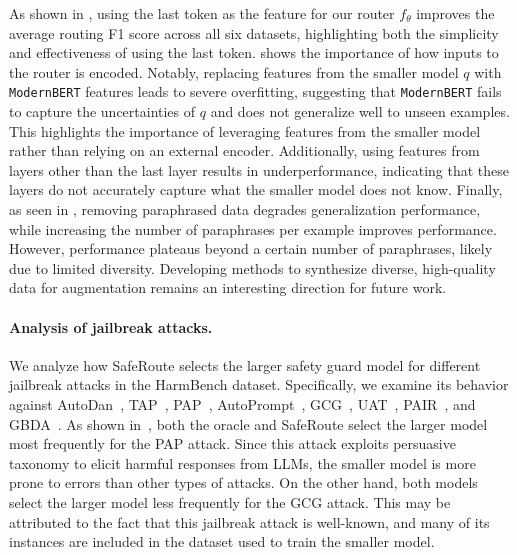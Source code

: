 As shown in , using the last token as the feature for our router $f_\theta$ improves the average routing F1 score across all six datasets, highlighting both the simplicity and effectiveness of using the last token.  
 shows the importance of how inputs to the router is encoded. Notably, replacing features from the smaller model $q$ with \texttt{ModernBERT} features leads to severe overfitting, suggesting that \texttt{ModernBERT} fails to capture the uncertainties of $q$ and does not generalize well to unseen examples. This highlights the importance of leveraging features from the smaller model rather than relying on an external encoder. Additionally, using features from layers other than the last layer results in underperformance, indicating that these layers do not accurately capture what the smaller model does not know.  
Finally, as seen in , removing paraphrased data degrades generalization performance, while increasing the number of paraphrases per example improves performance. However, performance plateaus beyond a certain number of paraphrases, likely due to limited diversity. Developing methods to synthesize diverse, high-quality data for augmentation remains an interesting direction for future work.



\paragraph{Analysis of jailbreak attacks.} We analyze how SafeRoute selects the larger safety guard model for different jailbreak attacks in the HarmBench dataset. Specifically, we examine its behavior against AutoDan~\citep{autodan}, TAP~\citep{tap}, PAP~\citep{pap}, AutoPrompt~\citep{autoprompt}, GCG~\citep{zou2023universal}, UAT~\citep{uat}, PAIR~\citep{pair}, and GBDA~\citep{gbda}. As shown in~, both the oracle and SafeRoute select the larger model most frequently for the PAP attack. Since this attack exploits persuasive taxonomy to elicit harmful responses from LLMs, the smaller model is more prone to errors than other types of attacks. On the other hand, both models select the larger model less frequently for the GCG attack. This may be attributed to the fact that this jailbreak attack is well-known, and many of its instances are included in the dataset used to train the smaller model.


% 


% 